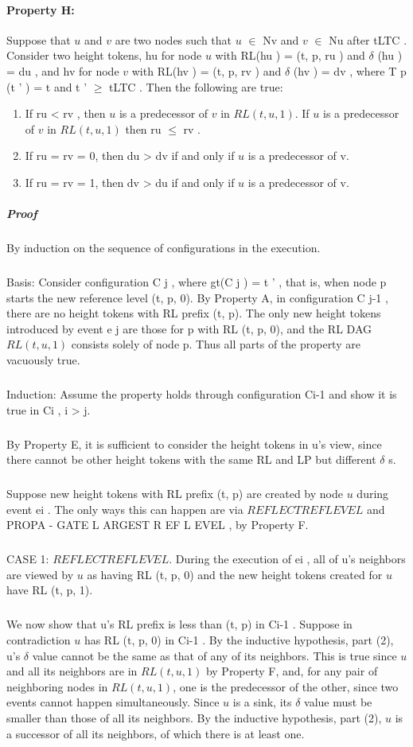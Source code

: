 \paragraph{Property H:} Suppose that $u$ and $v$ are two nodes such that $u$ $\in$ Nv and $v$ $\in$ Nu after tLTC . Consider two height tokens, hu for node $u$ with RL(hu ) = (t, p, ru ) and $\delta$ (hu ) = du , and hv for node $v$ with RL(hv ) = (t, p, rv ) and $\delta$ (hv ) = dv , where T p (t ' ) = t and t ' $\geq$ tLTC . Then the following are true:
\begin{enumerate}
	\item If ru < rv , then $u$ is a predecessor of $v$ in $RL (t, u, 1)$. If $u$ is a predecessor of $v$ in $RL (t, u, 1)$ then ru $\leq$ rv .
	\item If ru = rv = 0, then du > dv if and only if $u$ is a predecessor of v.
	\item If ru = rv = 1, then dv > du if and only if $u$ is a predecessor of v.
\end{enumerate}
\subparagraph{Proof} By induction on the sequence of configurations in the execution. 
\subparagraph{}Basis: Consider configuration C j , where gt(C j ) = t ' , that is, when node p starts the new reference level (t, p, 0). By Property A, in configuration C j-1 , there are no height tokens with RL prefix (t, p). The only new height tokens introduced by event e j are those for p with RL (t, p, 0), and the RL DAG $RL (t, u, 1)$ consists solely of node p. Thus all parts of the property are vacuously true.
\subparagraph{}Induction: Assume the property holds through configuration Ci-1 and show it is true in Ci , i > j.
\subparagraph{}By Property E, it is sufficient to consider the height tokens in u's view, since there cannot be other height tokens with the same RL and LP but different $\delta$ s.
\subparagraph{}Suppose new height tokens with RL prefix (t, p) are created by node $u$ during event ei . The only ways this can happen are via $REFLECTREFLEVEL$ and PROPA - GATE L ARGEST R EF L EVEL , by Property F.
\subparagraph{}CASE 1: $REFLECTREFLEVEL$. During the execution of ei , all of u's neighbors are viewed by $u$ as having RL (t, p, 0) and the new height tokens created for $u$ have RL (t, p, 1).
\subparagraph{}We now show that u's RL prefix is less than (t, p) in Ci-1 . Suppose in contradiction $u$ has RL (t, p, 0) in Ci-1 . By the inductive hypothesis, part (2), u's $\delta$ value cannot be the same as that of any of its neighbors. This is true since $u$ and all its neighbors are in $RL (t, u, 1)$ by Property F, and, for any pair of neighboring nodes in $RL (t, u, 1)$, one is the predecessor of the other, since two events cannot happen simultaneously. Since $u$ is a sink, its $\delta$ value must be smaller than those of all its neighbors. By the inductive hypothesis, part (2), $u$ is a successor of all its neighbors, of which there is at least one.
